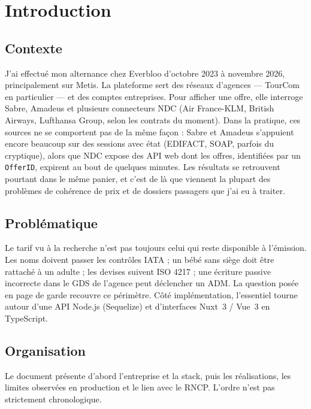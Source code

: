 \chapter{Introduction}
\label{chap:introduction}

\section{Contexte}

J'ai effectué mon alternance chez Everbloo d'octobre 2023 à novembre 2026, principalement sur Metis. La plateforme sert des réseaux d'agences --- TourCom en particulier --- et des comptes entreprises. Pour afficher une offre, elle interroge Sabre, Amadeus et plusieurs connecteurs NDC (Air France-KLM, British Airways, Lufthansa Group, selon les contrats du moment). Dans la pratique, ces sources ne se comportent pas de la même façon : Sabre et Amadeus s'appuient encore beaucoup sur des sessions avec état (EDIFACT, SOAP, parfois du cryptique), alors que NDC expose des API web dont les offres, identifiées par un \texttt{OfferID}, expirent au bout de quelques minutes. Les résultats se retrouvent pourtant dans le même panier, et c'est de là que viennent la plupart des problèmes de cohérence de prix et de dossiers passagers que j'ai eu à traiter.

\section{Problématique}

Le tarif vu à la recherche n'est pas toujours celui qui reste disponible à l'émission. Les noms doivent passer les contrôles IATA ; un bébé sans siège doit être rattaché à un adulte ; les devises suivent ISO 4217 ; une écriture passive incorrecte dans le GDS de l'agence peut déclencher un ADM. La question posée en page de garde recouvre ce périmètre. Côté implémentation, l'essentiel tourne autour d'une API Node.js (Sequelize) et d'interfaces Nuxt~3 / Vue~3 en TypeScript.

\section{Organisation}

Le document présente d'abord l'entreprise et la stack, puis les réalisations, les limites observées en production et le lien avec le RNCP. L'ordre n'est pas strictement chronologique.
